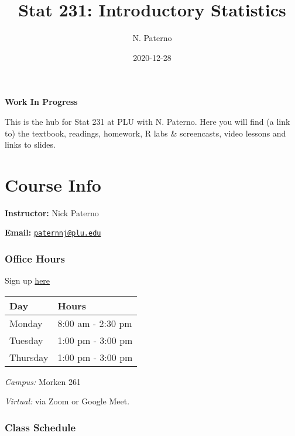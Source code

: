 \documentclass[
]{book}
\title{Stat 231: Introductory Statistics}
\author{N. Paterno}
\date{2020-12-28}
\begin{document}
\maketitle

{
\setcounter{tocdepth}{1}
\tableofcontents
}
\hypertarget{section}{%
\chapter*{}\label{section}}

\textbf{Work In Progress}

This is the hub for Stat 231 at PLU with N. Paterno. Here you will find (a link to) the textbook, readings, homework, R labs \& screencasts, video lessons and links to slides.

\hypertarget{info}{%
\chapter{Course Info}\label{info}}



\textbf{Instructor:} Nick Paterno

\textbf{Email:} \href{mailto:paternnj@plu.edu}{\nolinkurl{paternnj@plu.edu}}

\hypertarget{office-hours}{%
\subsection{Office Hours}\label{office-hours}}

Sign up \href{https://calendar.google.com/calendar/u/0/selfsched?sstoken=UUEtUG1vWXBzQWVnfGRlZmF1bHR8MDkxZTNlNTE2MzdjYTI4ZTY2MmFkNmRlZjI0OTNlNDI}{here}

\begin{tabular}{l|l}
\hline
Day & Hours\\
\hline
Monday & 8:00 am - 2:30 pm\\
\hline
Tuesday & 1:00 pm - 3:00 pm\\
\hline
Thursday & 1:00 pm - 3:00 pm\\
\hline
\end{tabular}

\emph{Campus:} Morken 261

\emph{Virtual:} via Zoom or Google Meet.

\hypertarget{class-schedule}{%
\subsection{Class Schedule}\label{class-schedule}}
\end{document}
